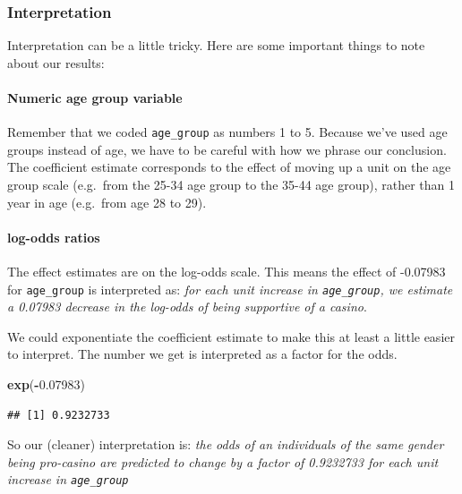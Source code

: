\documentclass[
]{book}
\newenvironment{Shaded}{\begin{snugshade}}{\end{snugshade}}
\newcommand{\FloatTok}[1]{\textcolor[rgb]{0.00,0.00,0.81}{#1}}
\newcommand{\KeywordTok}[1]{\textcolor[rgb]{0.13,0.29,0.53}{\textbf{#1}}}
\newcommand{\NormalTok}[1]{#1}
\newcommand{\OperatorTok}[1]{\textcolor[rgb]{0.81,0.36,0.00}{\textbf{#1}}}
\begin{document}
\hypertarget{interpretation}{%
\subsubsection{Interpretation}\label{interpretation}}

Interpretation can be a little tricky. Here are some important things to note about our results:

\hypertarget{numeric-age-group-variable}{%
\paragraph{Numeric age group variable}\label{numeric-age-group-variable}}

Remember that we coded \texttt{age\_group} as numbers 1 to 5. Because we've used age groups instead of age, we have to be careful with how we phrase our conclusion. The coefficient estimate corresponds to the effect of moving up a unit on the age group scale (e.g.~from the 25-34 age group to the 35-44 age group), rather than 1 year in age (e.g.~from age 28 to 29).

\hypertarget{log-odds-ratios}{%
\paragraph{log-odds ratios}\label{log-odds-ratios}}

The effect estimates are on the log-odds scale. This means the effect of -0.07983 for \texttt{age\_group} is interpreted as: \emph{for each unit increase in \texttt{age\_group}, we estimate a 0.07983 decrease in the log-odds of being supportive of a casino}.

We could exponentiate the coefficient estimate to make this at least a little easier to interpret. The number we get is interpreted as a factor for the odds.

\begin{Shaded}
\begin{Highlighting}[]
\KeywordTok{exp}\NormalTok{(}\OperatorTok{-}\FloatTok{0.07983}\NormalTok{)}
\end{Highlighting}
\end{Shaded}

\begin{verbatim}
## [1] 0.9232733
\end{verbatim}

So our (cleaner) interpretation is:
\emph{the odds of an individuals of the same gender being pro-casino are predicted to change by a factor of 0.9232733 for each unit increase in \texttt{age\_group}}
\end{document}
